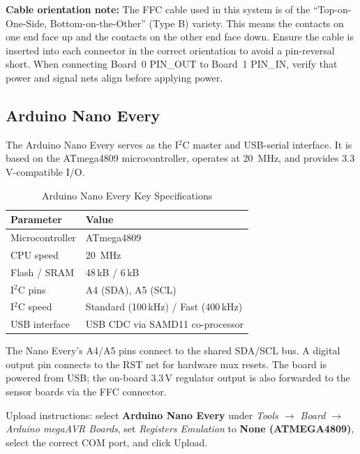 \documentclass[12pt]{article}
\begin{document}
\textbf{Cable orientation note:} The FFC cable used in this system is of the
``Top-on-One-Side, Bottom-on-the-Other'' (Type B) variety. This means the
contacts on one end face up and the contacts on the other end face down.
Ensure the cable is inserted into each connector in the correct orientation
to avoid a pin-reversal short. When connecting Board~0 PIN\_OUT to
Board~1 PIN\_IN, verify that power and signal nets align before applying
power.

\subsection{Arduino Nano Every}

The Arduino Nano Every serves as the I$^2$C master and USB-serial interface.
It is based on the ATmega4809 microcontroller, operates at \SI{20}{\mega\hertz},
and provides 3.3\,V-compatible I/O.

\begin{table}[H]
  \centering
  \caption{Arduino Nano Every Key Specifications}
  \begin{tabular}{ll}
    \toprule
    \textbf{Parameter} & \textbf{Value} \\
    \midrule
    Microcontroller    & ATmega4809 \\
    CPU speed          & \SI{20}{\mega\hertz} \\
    Flash / SRAM       & 48\,kB / 6\,kB \\
    I$^2$C pins        & A4 (SDA), A5 (SCL) \\
    I$^2$C speed       & Standard (100\,kHz) / Fast (400\,kHz) \\
    USB interface      & USB CDC via SAMD11 co-processor \\
    \bottomrule
  \end{tabular}
  \label{tab:nano_specs}
\end{table}

The Nano Every's A4/A5 pins connect to the shared SDA/SCL bus. A digital
output pin connects to the RST net for hardware mux resets. The board is
powered from USB; the on-board 3.3\,V regulator output is also forwarded to
the sensor boards via the FFC connector.

Upload instructions: select \textbf{Arduino Nano Every} under
\textit{Tools $\rightarrow$ Board $\rightarrow$ Arduino megaAVR Boards},
set \textit{Registers Emulation} to \textbf{None (ATMEGA4809)}, select
the correct COM port, and click Upload.

\newpage
\end{document}
